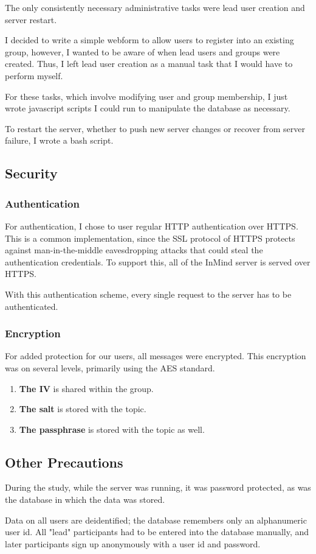       The only consistently necessary administrative tasks were lead user creation
      and server restart.

      I decided to write a simple webform to allow users to register
      into an existing group,
      however, I wanted to be aware of when lead users and groups were created.
      Thus, I left lead user creation as a manual task that I would have to
      perform myself.

      For these tasks, which involve modifying user and group membership,
      I just wrote javascript scripts I could run to manipulate the database
      as necessary.

      To restart the server,
      whether to push new server changes or recover from server failure,
      I wrote a bash script.

    \subsection{Security}
      \subsubsection{Authentication}
        For authentication, I chose to user regular HTTP authentication over HTTPS.
        This is a common implementation, since the SSL protocol of HTTPS
        protects against man-in-the-middle
        eavesdropping attacks that could steal the authentication credentials.
        To support this, all of the InMind server is served over HTTPS.

        With this authentication scheme,
        every single request to the server has to be authenticated.

      \subsubsection{Encryption}
        For added protection for our users, all messages were encrypted.
        This encryption was on several levels, primarily using the AES standard.

        \begin{enumerate}
        \item \textbf{The IV} is shared within the group.
        \item \textbf{The salt} is stored with the topic.
        \item \textbf{The passphrase} is stored with the topic as well.
        \end{enumerate}

      \subsection{Other Precautions}
      During the study, while the server was running, it was password protected,
      as was the database in which the data was stored.

      Data on all users are deidentified;
      the database remembers only an alphanumeric user id.
      All "lead" participants had to be entered into the database manually,
      and later participants sign up anonymously with a user id and password.
